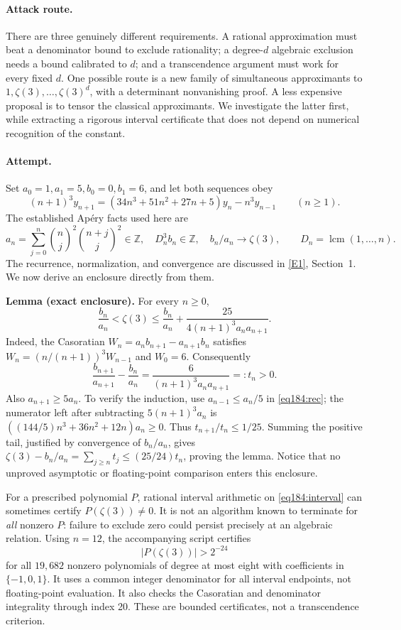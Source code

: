 \documentclass[11pt,a4paper]{article}
\newcommand{\Z}{\mathbb{Z}}
\newcommand{\eref}[2]{\hyperlink{extra:#1:#2}{[E#2]}}
\numberwithin{equation}{section}
\begin{document}
\paragraph{Attack route.}
There are three genuinely different requirements. A rational approximation must beat a denominator bound to exclude rationality; a degree-$d$ algebraic exclusion needs a bound calibrated to $d$; and a transcendence argument must work for every fixed $d$. One possible route is a new family of simultaneous approximants to $1,\zeta(3),\ldots,\zeta(3)^d$, with a determinant nonvanishing proof. A less expensive proposal is to tensor the classical approximants. We investigate the latter first, while extracting a rigorous interval certificate that does not depend on numerical recognition of the constant.

\paragraph{Attempt.}
Set $a_0=1,a_1=5,b_0=0,b_1=6$, and let both sequences obey
\begin{equation}\label{eq184:rec}
(n+1)^3y_{n+1}=(34n^3+51n^2+27n+5)y_n-n^3y_{n-1}\qquad(n\ge1).
\end{equation}
The established Ap\'ery facts used here are
\[
 a_n=\sum_{j=0}^n\binom nj^2\binom{n+j}j^2\in\Z,
 \quad D_n^3b_n\in\Z,\quad b_n/a_n\longrightarrow\zeta(3),
 \qquad D_n=\operatorname{lcm}(1,\ldots,n).
\]
The recurrence, normalization, and convergence are discussed in \eref{1283}{1}, Section~1. We now derive an enclosure directly from them.

\textbf{Lemma (exact enclosure).} For every $n\ge0$,
\begin{equation}\label{eq184:interval}
\frac{b_n}{a_n}<\zeta(3)
 \le \frac{b_n}{a_n}+\frac{25}{4(n+1)^3a_na_{n+1}}.
\end{equation}
Indeed, the Casoratian $W_n=a_nb_{n+1}-a_{n+1}b_n$ satisfies
$W_n=(n/(n+1))^3W_{n-1}$ and $W_0=6$. Consequently
\[
 \frac{b_{n+1}}{a_{n+1}}-\frac{b_n}{a_n}
 =\frac{6}{(n+1)^3a_na_{n+1}}=:t_n>0.
\]
Also $a_{n+1}\ge5a_n$. To verify the induction, use
$a_{n-1}\le a_n/5$ in \eqref{eq184:rec}; the numerator left after subtracting $5(n+1)^3a_n$ is
$((144/5)n^3+36n^2+12n)a_n\ge0$.
Thus $t_{n+1}/t_n\le1/25$. Summing the positive tail, justified by convergence of $b_n/a_n$, gives
$\zeta(3)-b_n/a_n=\sum_{j\ge n}t_j\le(25/24)t_n$, proving the lemma. Notice that no unproved asymptotic or floating-point comparison enters this enclosure.

For a prescribed polynomial $P$, rational interval arithmetic on \eqref{eq184:interval} can sometimes certify $P(\zeta(3))\ne0$. It is not an algorithm known to terminate for \emph{all} nonzero $P$: failure to exclude zero could persist precisely at an algebraic relation. Using $n=12$, the accompanying script certifies
\[
 |P(\zeta(3))|>2^{-24}
\]
for all $19{,}682$ nonzero polynomials of degree at most eight with
coefficients in $\{-1,0,1\}$. It uses a common integer denominator for
all interval endpoints, not floating-point evaluation. It also checks
the Casoratian and denominator integrality through index 20. These
are bounded certificates, not a transcendence criterion.
\end{document}
